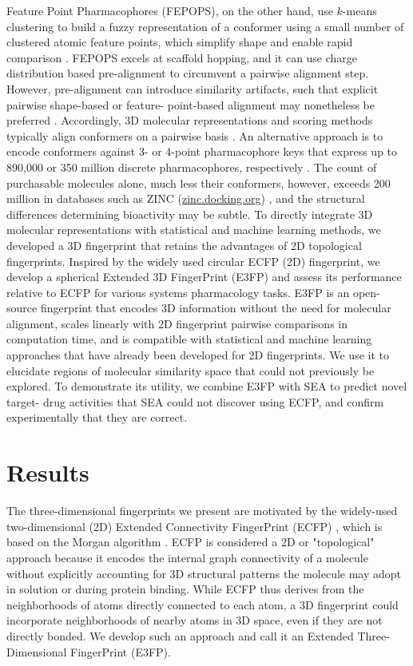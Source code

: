 \documentclass[../../main.tex]{subfiles}
\begin{document}
\begin{refsection}
	Feature Point Pharmacophores (FEPOPS), on the other hand, use $k$-means clustering to build a fuzzy representation of a conformer using a small number of clustered atomic feature points, which simplify shape and enable rapid comparison \supercite{jenkins_2004,jenkins_2013}.
	FEPOPS excels at scaffold hopping, and it can use charge distribution based pre-alignment to circumvent a pairwise alignment step.
	However, pre-alignment can introduce similarity artifacts, such that explicit pairwise shape-based or feature- point-based alignment may nonetheless be preferred \supercite{jenkins_2004}.
	Accordingly, 3D molecular representations and scoring methods typically align conformers on a pairwise basis \supercite{nicholls_2010,sheridan_2002}.
	An alternative approach is to encode conformers against 3- or 4-point pharmacophore keys that express up to 890,000 or 350 million discrete pharmacophores, respectively \supercite{mason_1999,pickett_1996}.
	The count of purchasable molecules alone, much less their conformers, however, exceeds 200 million in databases such as ZINC (\url{zinc.docking.org}) \supercite{sterling_2015}, and the structural differences determining bioactivity may be subtle.
	To directly integrate 3D molecular representations with statistical and machine learning methods, we developed a 3D fingerprint that retains the advantages of 2D topological fingerprints.
	Inspired by the widely used circular ECFP (2D) fingerprint, we develop a spherical Extended 3D FingerPrint (E3FP) and assess its performance relative to ECFP for various systems pharmacology tasks.
	E3FP is an open-source fingerprint that encodes 3D information without the need for molecular alignment, scales linearly with 2D fingerprint pairwise comparisons in computation time, and is compatible with statistical and machine learning approaches that have already been developed for 2D fingerprints.
	We use it to elucidate regions of molecular similarity space that could not previously be explored.
	To demonstrate its utility, we combine E3FP with SEA to predict novel target- drug activities that SEA could not discover using ECFP, and confirm experimentally that they are correct.

	\section{Results}\label{sec:results}

	The three-dimensional fingerprints we present are motivated by the widely-used two-dimensional (2D) Extended Connectivity FingerPrint  (ECFP) \supercite{rogers_2010}, which is based on the Morgan algorithm  \supercite{morgan_1965}.
	ECFP is considered a 2D or "topological" approach because it encodes the internal graph connectivity of a molecule without explicitly accounting for 3D structural patterns the molecule may adopt in solution or during protein binding.
	While ECFP thus derives from the neighborhoods of atoms directly connected to each atom, a 3D fingerprint could incorporate neighborhoods of nearby atoms in 3D space, even if they are not directly bonded.
	We develop such an approach and call it an Extended Three-Dimensional FingerPrint (E3FP).


\end{refsection}
\end{document}
